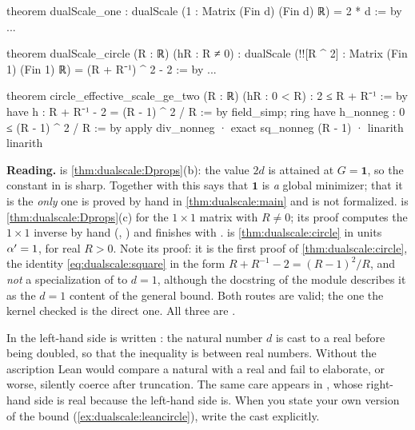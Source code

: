 \begin{leanbox}
\begin{leancode}
theorem dualScale_one : dualScale (1 : Matrix (Fin d) (Fin d) ℝ) = 2 * d := by ...

theorem dualScale_circle (R : ℝ) (hR : R ≠ 0) :
    dualScale (!![R ^ 2] : Matrix (Fin 1) (Fin 1) ℝ) = (R + R⁻¹) ^ 2 - 2 := by ...

theorem circle_effective_scale_ge_two (R : ℝ) (hR : 0 < R) : 2 ≤ R + R⁻¹ := by
  have h : R + R⁻¹ - 2 = (R - 1) ^ 2 / R := by field_simp; ring
  have h_nonneg : 0 ≤ (R - 1) ^ 2 / R := by
    apply div_nonneg
    · exact sq_nonneg (R - 1)
    · linarith
  linarith
\end{leancode}
\textbf{Reading.}  is \cref{thm:dualscale:Dprops}(b): the value $2d$ is
attained at $G=\mathbf1$, so the constant in  is sharp. Together with
 this says that $\mathbf1$ is \emph{a} global minimizer; that it is the
\emph{only} one is proved by hand in \cref{thm:dualscale:main} and is not formalized.
 is \cref{thm:dualscale:Dprops}(c) for the $1\times1$ matrix
\lean{!![R\^{}2]} with $R\ne0$; its proof computes the $1\times1$ inverse by hand
(, ) and finishes with .
 is \cref{thm:dualscale:circle} in units $\alpha'=1$, for
real $R>0$. Note its proof: it is the first proof of \cref{thm:dualscale:circle}, the identity
\eqref{eq:dualscale:square} in the form $R+R^{-1}-2=(R-1)^2/R$, and \emph{not} a
specialization of  to $d=1$, although the docstring of the module
describes it as the $d=1$ content of the general bound. Both routes are valid; the one the
kernel checked is the direct one. All three are \TA.
\end{leanbox}

\begin{pitfallbox}
In  the left-hand side is written : the natural number
$d$ is cast to a real before being doubled, so that the inequality is between real numbers.
Without the ascription Lean would compare a natural with a real and fail to elaborate, or
worse, silently coerce after truncation. The same care appears in , whose
right-hand side  is real because the left-hand side is. When you state your own
version of the bound (\cref{ex:dualscale:leancircle}), write the cast explicitly.
\end{pitfallbox}

